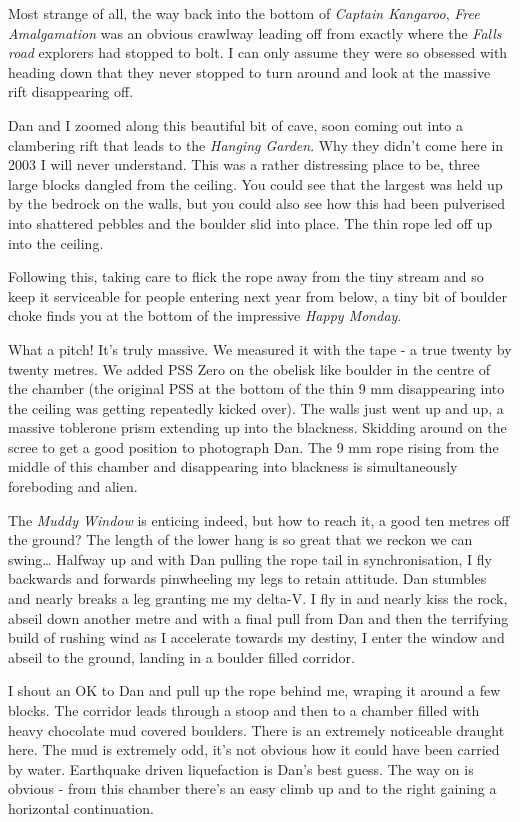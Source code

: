 Most strange of all, the way back into the bottom of \emph{Captain
Kangaroo}, \emph{Free Amalgamation} was an obvious crawlway leading off
from exactly where the \emph{Falls road} explorers had stopped to bolt.
I can only assume they were so obsessed with heading down that they
never stopped to turn around and look at the massive rift disappearing
off.

Dan and I zoomed along this beautiful bit of cave, soon coming out into
a clambering rift that leads to the \emph{Hanging Garden}. Why they
didn't come here in 2003 I will never understand. This was a rather
distressing place to be, three large blocks dangled from the ceiling.
You could see that the largest was held up by the bedrock on the walls,
but you could also see how this had been pulverised into shattered
pebbles and the boulder slid into place. The thin rope led off up into
the ceiling.

Following this, taking care to flick the rope away from the tiny stream
and so keep it serviceable for people entering next year from below, a
tiny bit of boulder choke finds you at the bottom of the impressive
\emph{Happy Monday}.

What a pitch! It's truly massive. We measured it with the tape - a true
twenty by twenty metres. We added PSS Zero on the obelisk like boulder
in the centre of the chamber (the original PSS at the bottom of the thin
9 mm disappearing into the ceiling was getting repeatedly kicked over).
The walls just went up and up, a massive toblerone prism extending up
into the blackness. Skidding around on the scree to get a good position
to photograph Dan. The 9 mm rope rising from the middle of this chamber
and disappearing into blackness is simultaneously foreboding and alien.

The \emph{Muddy Window} is enticing indeed, but how to reach it, a good
ten metres off the ground? The length of the lower hang is so great that
we reckon we can swing\ldots{} Halfway up and with Dan pulling the rope
tail in synchronisation, I fly backwards and forwards pinwheeling my
legs to retain attitude. Dan stumbles and nearly breaks a leg granting
me my delta-V. I fly in and nearly kiss the rock, abseil down another
metre and with a final pull from Dan and then the terrifying build of
rushing wind as I accelerate towards my destiny, I enter the window and
abseil to the ground, landing in a boulder filled corridor.

I shout an OK to Dan and pull up the rope behind me, wraping it around a
few blocks. The corridor leads through a stoop and then to a chamber
filled with heavy chocolate mud covered boulders. There is an extremely
noticeable draught here. The mud is extremely odd, it's not obvious how
it could have been carried by water. Earthquake driven liquefaction is
Dan's best guess. The way on is obvious - from this chamber there's an
easy climb up and to the right gaining a horizontal continuation.

